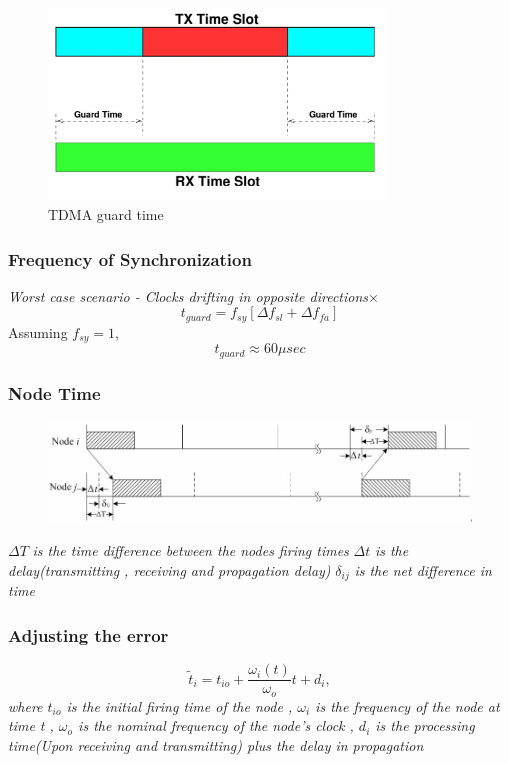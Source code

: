 \documentclass[t]{beamer}
\begin{document}
\begin{frame}
\begin{figure}
 \includegraphics[width=0.8\textwidth]{a_slot}
 \caption{TDMA guard time}
\end{figure}
\end{frame}
\begin{frame}
    \frametitle{Frequency of Synchronization}
\textit{Worst case scenario - Clocks drifting in opposite
directions}×
\begin{equation}
t_{guard} = f_{sy}[\Delta f_{sl} + \Delta f_{fa}]
\end{equation}
Assuming $f_{sy}=1$,
\begin{equation}
 t_{guard} \approx 60 \mu sec
\end{equation}
\end{frame}
\begin{frame}
    \frametitle{Node Time}
    \begin{figure}
     \includegraphics[width=0.8 \textwidth]{node_time}
    \end{figure}
     $\Delta T$ \textit{is the time difference between the nodes firing times}    \newline
    $\Delta t$ \textit{is the delay(transmitting , receiving and propagation delay)} \newline
    $\delta_{ij}$ \textit{is the net difference in time}
\end{frame}
\begin{frame}
    \frametitle{Adjusting the error}
    \begin{equation}
         \tilde t_{i} = t_{io} + \frac{\omega_i(t)}{\omega_o}t + d_i  ,
    \end{equation}
    \newline
    \textit{
where \newline
 $t_{io}$ is the initial firing time of the node ,\newline
 $\omega_i$ is the frequency of the node at time t ,\newline
 $\omega_o$ is the nominal frequency of the node's clock , \newline
 $d_i$ is the processing time(Upon receiving and transmitting) plus the delay in propagation}
\end{frame}
\end{document}
